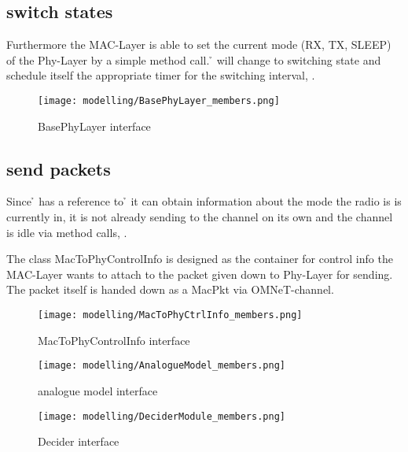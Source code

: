 \subsection{switch states}

Furthermore the MAC-Layer is able to set the current mode (RX, TX, SLEEP) of the Phy-Layer by a simple method call.
\h{\bp} will change to switching state and schedule itself the appropriate timer for the switching interval, .

\begin{figure}[h]
 \centering
 \texttt{[image: modelling/BasePhyLayer\_members.png]}
 \caption{BasePhyLayer interface}
 \label{fig: BasePhyLayer interface}
\end{figure}

\subsection{send packets}

Since \h{\bm} has a reference to \h{\bp} it can obtain information about the mode the radio is is currently in, it is not already sending to the channel on its own and the channel is idle via method calls, .

The class MacToPhyControlInfo is designed as the container for control info the MAC-Layer
wants to attach to the packet given down to Phy-Layer for sending.
The packet itself is handed down as a MacPkt via OMNeT-channel. 

\begin{figure}[h]
 \centering
 \texttt{[image: modelling/MacToPhyCtrlInfo\_members.png]}
 \caption{MacToPhyControlInfo interface}
 \label{fig: MacToPhyCtrlInfo interface}
\end{figure}




\begin{figure}[h]
 \centering
 \texttt{[image: modelling/AnalogueModel\_members.png]}
 \caption{analogue model interface}
 \label{fig: analogue model interface}
\end{figure}



\begin{figure}[h]
 \centering
 \texttt{[image: modelling/DeciderModule\_members.png]}
 \caption{Decider interface}
 \label{fig: Decider interface}
\end{figure}

